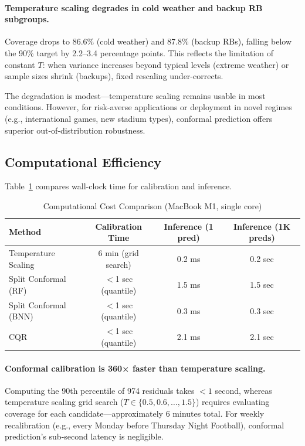 \paragraph{Temperature scaling degrades in cold weather and backup RB subgroups.}
Coverage drops to 86.6\% (cold weather) and 87.8\% (backup RBs), falling below the 90\% target by 2.2--3.4 percentage points. This reflects the limitation of constant $T$: when variance increases beyond typical levels (extreme weather) or sample sizes shrink (backups), fixed rescaling under-corrects.

The degradation is modest—temperature scaling remains usable in most conditions. However, for risk-averse applications or deployment in novel regimes (e.g., international games, new stadium types), conformal prediction offers superior out-of-distribution robustness.

\subsection{Computational Efficiency}\label{subsec:conformal-efficiency}

Table~\ref{tab:conformal-timing} compares wall-clock time for calibration and inference.

\begin{table}[t]
\centering
\caption{Computational Cost Comparison (MacBook M1, single core)}
\label{tab:conformal-timing}
\begin{tabular}{@{}lccc@{}}
\toprule
\textbf{Method} & \textbf{Calibration Time} & \textbf{Inference (1 pred)} & \textbf{Inference (1K preds)} \\
\midrule
Temperature Scaling & 6 min (grid search) & 0.2 ms & 0.2 sec \\
Split Conformal (RF) & $<$1 sec (quantile) & 1.5 ms & 1.5 sec \\
Split Conformal (BNN) & $<$1 sec (quantile) & 0.3 ms & 0.3 sec \\
CQR & $<$1 sec (quantile) & 2.1 ms & 2.1 sec \\
\bottomrule
\end{tabular}
\end{table}


\paragraph{Conformal calibration is 360× faster than temperature scaling.}
Computing the 90th percentile of 974 residuals takes $<1$ second, whereas temperature scaling grid search ($T \in \{0.5, 0.6, \ldots, 1.5\}$) requires evaluating coverage for each candidate—approximately 6 minutes total. For weekly recalibration (e.g., every Monday before Thursday Night Football), conformal prediction's sub-second latency is negligible.


